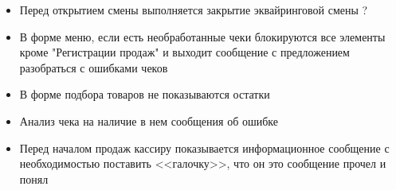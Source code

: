 \begin{itemize}
 	\item Перед открытием смены выполняется закрытие эквайринговой смены ?
 	\item В форме меню, если есть необработанные чеки блокируются все элементы кроме "Регистрации продаж" и выходит сообщение с предложением разобраться с ошибками чеков
 	\item В форме подбора товаров не показываются остатки
 	\item Анализ чека на наличие в нем сообщения об ошибке
	\item Перед началом продаж кассиру показывается информационное сообщение с необходимостью поставить <<галочку>>, что он это сообщение прочел и понял
 
	
\end{itemize}


